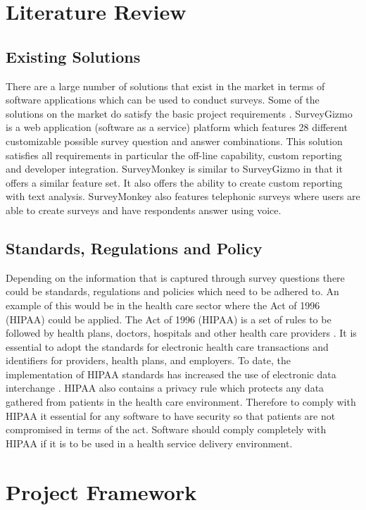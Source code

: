 \documentclass[12pt]{witseiepaper}
\begin{document}
\section{Literature Review}
\subsection{Existing Solutions}

There are a large number of solutions that exist in the market in terms of software applications which can be used to conduct surveys. Some of the solutions on the market do satisfy the basic project requirements \cite{ReviewSurvey}. SurveyGizmo \cite{SurveyGizmo} is a web application (software as a service) platform which features 28 different customizable possible survey question and answer combinations. This solution satisfies all requirements in particular the off-line capability, custom reporting and developer integration. SurveyMonkey \cite{SurveyMonkey} is similar to SurveyGizmo in that it offers a similar feature set. It also offers the ability to create custom reporting with text analysis. SurveyMonkey also features telephonic surveys where users are able to create surveys and have respondents answer using voice. 

\subsection{Standards, Regulations and Policy}
Depending on the information that is captured through survey questions there could be standards, regulations and policies which need to be adhered to. An example of this would be in the health care sector where the Act of 1996 (HIPAA) could be applied. The Act of 1996 (HIPAA) is a set of rules to be followed by health plans, doctors, hospitals and other health care providers \cite{HIPAA}. It is essential to adopt the standards for electronic health care transactions and identifiers for providers, health plans, and employers. To date, the implementation of HIPAA standards has increased the use of electronic data interchange \cite{HIPAA}. HIPAA also contains a privacy rule which protects any data gathered from patients in the health care environment. Therefore to comply with HIPAA it essential for any software to have security so that patients are not compromised in terms of the act. Software should comply completely with HIPAA if it is to be used in a health service delivery environment. \\

\section{Project Framework} 
\end{document}
